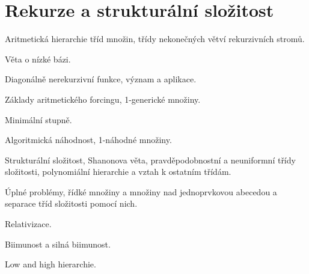 \newpage
\section{Rekurze a strukturální složitost}
\begin{pozadavky}
\begin{pitemize}
\item Aritmetická hierarchie tříd množin, třídy nekonečných větví rekurzivních stromů.
\item Věta o nízké bázi.
\item Diagonálně nerekurzivní funkce, význam a aplikace.
\item Základy aritmetického forcingu, 1-generické množiny.
\item Minimální stupně.
\item Algoritmická náhodnost, 1-náhodné množiny.
\item Strukturální složitost, Shanonova věta, pravděpodobnostní a neuniformní třídy složitosti, polynomiální hierarchie a vztah k ostatním třídám.
\item Úplné problémy, řídké množiny a množiny nad jednoprvkovou abecedou a separace tříd složitosti pomocí nich.
\item Relativizace.
\item Biimunost a silná biimunost.
\item Low and high hierarchie.
\end{pitemize}
\end{pozadavky}










